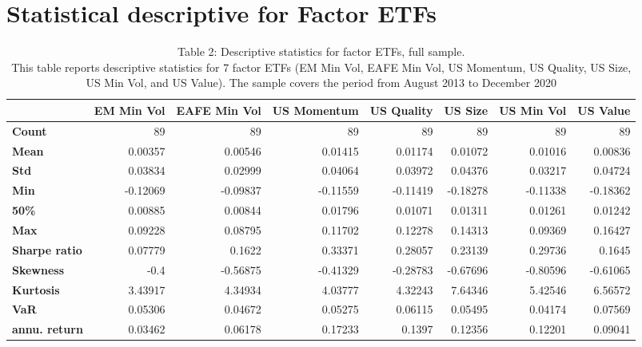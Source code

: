 \documentclass{article}
\begin{document}

\section{Statistical descriptive for Factor ETFs}


\begin{table}[h]
\centering

    \setlength{\tabcolsep}{2pt}
    
    \small\sffamily\centering

 \caption{Table 2: Descriptive statistics for factor ETFs, full sample.\\
This table reports descriptive statistics for 7 factor ETFs (EM Min Vol, EAFE Min Vol, US Momentum, US Quality, US Size, US Min Vol, and US Value). The sample covers the period from August 2013 to December 2020}

\begin{tabular}{lrrrrrrr}
    \toprule
          & \multicolumn{1}{c}{\textbf{EM Min Vol}} & \multicolumn{1}{c}{\textbf{EAFE Min Vol}} & \multicolumn{1}{c}{\textbf{US Momentum}} & \multicolumn{1}{c}{\textbf{US Quality}} & \multicolumn{1}{c}{\textbf{US Size}} & \multicolumn{1}{c}{\textbf{US Min Vol}} & \multicolumn{1}{c}{\textbf{US Value}} \\
    \midrule
    \midrule
    \textbf{Count} & 89    & 89    & 89    & 89    & 89    & 89    & 89 \\
    \textbf{Mean} & 0.00357 & 0.00546 & 0.01415 & 0.01174 & 0.01072 & 0.01016 & 0.00836 \\
    \textbf{Std} & 0.03834 & 0.02999 & 0.04064 & 0.03972 & 0.04376 & 0.03217 & 0.04724 \\
    \textbf{Min} & -0.12069 & -0.09837 & -0.11559 & -0.11419 & -0.18278 & -0.11338 & -0.18362 \\
    \textbf{50\%} & 0.00885 & 0.00844 & 0.01796 & 0.01071 & 0.01311 & 0.01261 & 0.01242 \\
    \textbf{Max} & 0.09228 & 0.08795 & 0.11702 & 0.12278 & 0.14313 & 0.09369 & 0.16427 \\
    \textbf{Sharpe ratio} & 0.07779 & 0.1622 & 0.33371 & 0.28057 & 0.23139 & 0.29736 & 0.1645 \\
    \textbf{Skewness} & -0.4  & -0.56875 & -0.41329 & -0.28783 & -0.67696 & -0.80596 & -0.61065 \\
    \textbf{Kurtosis} & 3.43917 & 4.34934 & 4.03777 & 4.32243 & 7.64346 & 5.42546 & 6.56572 \\
    \textbf{VaR} & 0.05306 & 0.04672 & 0.05275 & 0.06115 & 0.05495 & 0.04174 & 0.07569 \\
    \textbf{annu. return} & 0.03462 & 0.06178 & 0.17233 & 0.1397 & 0.12356 & 0.12201 & 0.09041 \\
    \bottomrule
    \end{tabular}%


  \label{tab:addlabel}%

\end{table}%
\end{document}
